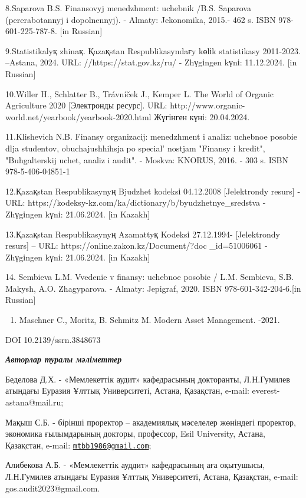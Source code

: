 {8.Saparova B.S. Finansovyj menedzhment: uchebnik /B.S. Saparova
(pererabotannyj i dopolnennyj). - Almaty: Jekonomika, 2015.- 462 s. ISBN
978-601-225-787-8. {[}in Russian{]}

9.Statistikalyқ zhinaқ. Қazaқstan Respublikasyndaғy kөlіk statistikasy
2011-2023. --Astana, 2024. URL: //https://stat.gov.kz/ru/ - Zhүgіngen
kүnі: 11.12.2024. {[}in Russian{]}

10.Willer H., Schlatter B., Trávníček J., Kemper L. The World of Organic
Agriculture 2020 {[}Электронды ресурс{]}. URL:
http://www.organic-world.net/yearbook/yearbook-2020.html Жүгінген күні:
20.04.2024.

11.Klishevich N.B. Finansy organizacij: menedzhment i analiz: uchebnoe
posobie dlja studentov, obuchajushhihsja po
special' nostjam "Finansy i kredit", "Buhgalterskij
uchet, analiz i audit". - Moskva: KNORUS, 2016. - 303 s. ISBN
978-5-406-04851-1

12.Қazaқstan Respublikasynyң Bjudzhet kodeksі 04.12.2008 {[}Jelektrondy
resurs{]} - URL:
https://kodeksy-kz.com/ka/dictionary/b/byudzhetnye\_sredstva - Zhүgіngen
kүnі: 21.06.2024. {[}in Kazakh{]}

13.Қazaқstan Respublikasynyң Azamattyқ Kodeksі 27.12.1994-
{[}Jelektrondy resurs{]} -- URL: https://online.zakon.kz/Document/?doc
\_id=51006061 - Zhүgіngen kүnі: 21.06.2024. {[}in Kazakh{]}

14. Sembieva L.M. Vvedenie v finansy: uchebnoe posobie / L.M. Sembieva,
S.B. Makysh, A.O. Zhagyparova. - Almaty: Jepigraf, 2020. ISBN
978-601-342-204-6.{[}in Russian{]}

\begin{enumerate}
\def\labelenumi{\arabic{enumi}.}
\setcounter{enumi}{15}
\item
  Maschner C., Moritz, B. Schmitz M. Modern Asset Management. -2021.
\end{enumerate}

DOI 10.2139/ssrn.3848673

\emph{{\bfseries Авторлар туралы мәліметтер}}

Беделова Д.Х. - «Мемлекеттік аудит» кафедрасының докторанты, Л.Н.Гумилев
атындағы Еуразия Ұлттық Университеті, Астана, Қазақстан, e-mail:
everest-astana@mail.ru;

Мақыш С.Б. - бірінші проректор -- академиялық мәселелер жөніндегі
проректор, экономика ғылымдарының докторы, профессор, Esil University,
Астана, Қазақстан, e-mail:
\href{mailto:mtbb1986@gmail.com}{\nolinkurl{mtbb1986@gmail.com}};

Алибекова А.Б. - «Мемлекеттік ауддит» кафедрасының аға оқытушысы,
Л.Н.Гумилев атындағы Еуразия Ұлттық Университеті, Астана, Қазақстан,
e-mail: gos.audit2023@gmail.com.

}
